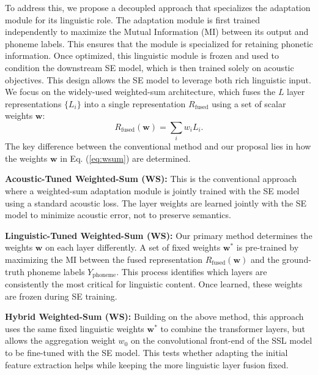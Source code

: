 \documentclass{article}
\begin{document}
To address this, we propose a decoupled approach that specializes the adaptation module for its linguistic role. The adaptation module is first trained independently to maximize the Mutual Information (MI) between its output and phoneme labels. This ensures that the module is specialized for retaining phonetic information. Once optimized, this linguistic module is frozen and used to condition the downstream SE model, which is then trained solely on acoustic objectives. This design allows the SE model to leverage both rich linguistic input. We focus on the widely-used weighted-sum architecture, which fuses the $L$ layer representations $\{L_i\}$ into a single representation $R_{\mathrm{fused}}$ using a set of scalar weights $\mathbf{w}$:
\begin{equation}
    R_{\mathrm{fused}}(\mathbf{w}) = \sum_i w_i L_i.
    \label{eq:wsum}
\end{equation}
The key difference between the conventional method and our proposal lies in how the weights $\mathbf{w}$ in Eq. (\ref{eq:wsum}) are determined.

\textbf{Acoustic-Tuned Weighted-Sum (WS):} This is the conventional approach where a weighted-sum adaptation module is jointly trained with the SE model using a standard acoustic loss. The layer weights are learned jointly with the SE model to minimize acoustic error, not to preserve semantics.

\textbf{Linguistic-Tuned Weighted-Sum (WS):} Our primary method determines the weights $\mathbf{w}$ on each layer differently. A set of fixed weights $\mathbf{w}^*$ is pre-trained by maximizing the MI between the fused representation $R_{\mathrm{fused}}(\mathbf{w})$ and the ground-truth phoneme labels $Y_{\mathrm{phoneme}}$. This process identifies which layers are consistently the most critical for linguistic content. Once learned, these weights are frozen during SE training.

\textbf{Hybrid Weighted-Sum (WS):} Building on the above method, this approach uses the same fixed linguistic weights $\mathbf{w}^*$ to combine the transformer layers, but allows the aggregation weight $w_0$ on the convolutional front-end of the SSL model to be fine-tuned with the SE model. This tests whether adapting the initial feature extraction helps while keeping the more linguistic layer fusion fixed.
\end{document}

